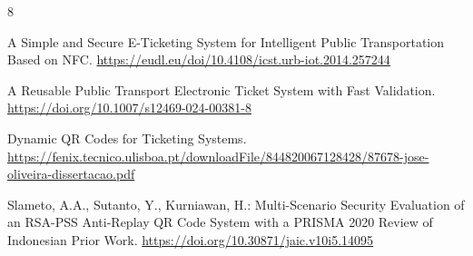 \documentclass[runningheads]{llncs}
\begin{document}
\begin{thebibliography}{8}

A Simple and Secure E-Ticketing System for Intelligent Public
Transportation Based on NFC.
\url{https://eudl.eu/doi/10.4108/icst.urb-iot.2014.257244}

A Reusable Public Transport Electronic Ticket System with Fast
Validation.
\url{https://doi.org/10.1007/s12469-024-00381-8}

Dynamic QR Codes for Ticketing Systems.
\url{https://fenix.tecnico.ulisboa.pt/downloadFile/844820067128428/87678-jose-oliveira-dissertacao.pdf}

Slameto, A.A., Sutanto, Y., Kurniawan, H.:
Multi-Scenario Security Evaluation of an RSA-PSS Anti-Replay QR Code
System with a PRISMA 2020 Review of Indonesian Prior Work.
\url{https://doi.org/10.30871/jaic.v10i5.14095}


\end{thebibliography}
\end{document}

